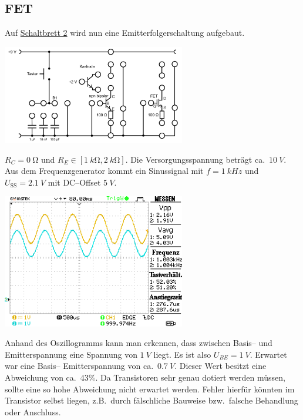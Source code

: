 \documentclass[10pt]{article}
\newenvironment{Figure}
  {\par\medskip\noindent\minipage{\linewidth}}
  {\endminipage\par\medskip}
\begin{document}
\begin{multicols}{2}
	\subsection{FET}
	Auf \hyperref[fig:schaltbrett_2]{Schaltbrett 2} wird nun eine Emitterfolgerschaltung aufgebaut.
	\begin{Figure}
		\centering
		\includegraphics[width=0.6\textwidth]{schaltbrett_2.png}
		 \label{fig:schaltbrett_2}
	\end{Figure}
	$R_C=\SI{0}{\ohm}$ und $R_E \in \left[\SI{1}{k\ohm},\SI{2}{k\ohm}\right]$.
	Die Versorgungsspannung beträgt ca.\ $\SI{10}{V}$.
	Aus dem Frequenzgenerator kommt ein Sinussignal mit $f=\SI{1}{kHz}$ und $U_{\text{SS}}=\SI{2.1}{V}$ mit DC--Offset $\SI{5}{V}$.
	\begin{Figure}
		\centering
		\includegraphics[width=0.6\textwidth]{../data/DS0011.png}
	\end{Figure}
	Anhand des Oszillogramms kann man erkennen, dass zwischen Basis-- und Emitterspannung eine Spannung von $\SI{1}{V}$ liegt.
	Es ist also $U_{BE}=\SI{1}{V}$.
	Erwartet war eine Basis-- Emitterspannung von ca.\ $\SI{0.7}{V}$.
	Dieser Wert besitzt eine Abweichung von ca.\ $43\%$.
	Da Transistoren sehr genau dotiert werden müssen, sollte eine so hohe Abweichung nicht erwartet werden.
	Fehler hierfür könnten im Transistor selbst liegen, z.B.\ durch fälschliche Bauweise bzw.\ falsche Behandlung oder Anschluss.\\\\

\end{multicols}
\end{document}
